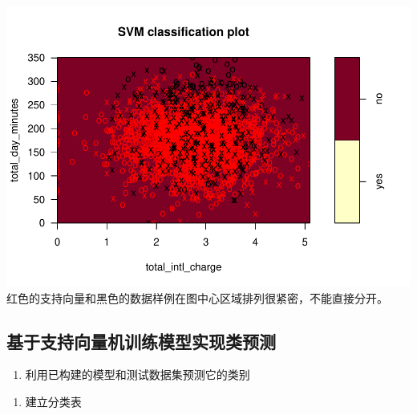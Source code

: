 \documentclass[
]{article}
\newenvironment{Shaded}{\begin{snugshade}}{\end{snugshade}}
\newcommand{\KeywordTok}[1]{\textcolor[rgb]{0.13,0.29,0.53}{\textbf{#1}}}
\newcommand{\NormalTok}[1]{#1}
\newcommand{\OperatorTok}[1]{\textcolor[rgb]{0.81,0.36,0.00}{\textbf{#1}}}
\newcommand{\StringTok}[1]{\textcolor[rgb]{0.31,0.60,0.02}{#1}}
\providecommand{\tightlist}{%
  \setlength{\itemsep}{0pt}\setlength{\parskip}{0pt}}
\begin{document}
\includegraphics{R_FinalReport_files/figure-latex/unnamed-chunk-5-1.pdf}
红色的支持向量和黑色的数据样例在图中心区域排列很紧密，不能直接分开。

\hypertarget{ux57faux4e8eux652fux6301ux5411ux91cfux673aux8badux7ec3ux6a21ux578bux5b9eux73b0ux7c7bux9884ux6d4b}{%
\subsection{基于支持向量机训练模型实现类预测}\label{ux57faux4e8eux652fux6301ux5411ux91cfux673aux8badux7ec3ux6a21ux578bux5b9eux73b0ux7c7bux9884ux6d4b}}

\begin{enumerate}
\def\labelenumi{\arabic{enumi}.}
\tightlist
\item
  利用已构建的模型和测试数据集预测它的类别
\end{enumerate}

\begin{Shaded}
\end{Shaded}

\begin{enumerate}
\def\labelenumi{\arabic{enumi}.}
\setcounter{enumi}{1}
\tightlist
\item
  建立分类表
\end{enumerate}

\begin{Shaded}
\end{Shaded}
\end{document}
